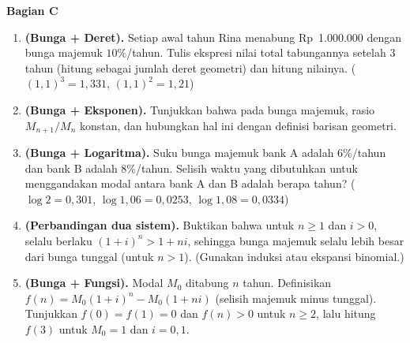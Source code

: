 \documentclass[11pt,a4paper]{report}
\theoremstyle{gaya}
\newcommand{\bagiansoal}[2]{%
  \par\medskip\noindent
  {\large\bfseries\color{biru}Bagian #1}\par\smallskip
  \addcontentsline{toc}{subsection}{Bagian #1}}
\begin{document}
\bagiansoal{C}{Advanced (setara Olimpiade SMA --- gabungan dengan Barisan/Deret \& Eksponen)}
\begin{enumerate}[leftmargin=*]
  \item \textbf{(Bunga + Deret).} Setiap awal tahun Rina menabung Rp~1.000.000 dengan bunga majemuk $10\%$/tahun. Tulis ekspresi nilai total tabungannya setelah 3 tahun (hitung sebagai jumlah deret geometri) dan hitung nilainya. ($(1{,}1)^3=1{,}331$, $(1{,}1)^2=1{,}21$)
  \item \textbf{(Bunga + Eksponen).} Tunjukkan bahwa pada bunga majemuk, rasio $M_{n+1}/M_n$ konstan, dan hubungkan hal ini dengan definisi barisan geometri.
  \item \textbf{(Bunga + Logaritma).} Suku bunga majemuk bank A adalah $6\%$/tahun dan bank B adalah $8\%$/tahun. Selisih waktu yang dibutuhkan untuk menggandakan modal antara bank A dan B adalah berapa tahun? ($\log 2=0{,}301$, $\log 1{,}06=0{,}0253$, $\log 1{,}08=0{,}0334$)
  \item \textbf{(Perbandingan dua sistem).} Buktikan bahwa untuk $n \ge 1$ dan $i > 0$, selalu berlaku $(1+i)^n > 1+ni$, sehingga bunga majemuk selalu lebih besar dari bunga tunggal (untuk $n > 1$). (Gunakan induksi atau ekspansi binomial.)
  \item \textbf{(Bunga + Fungsi).} Modal $M_0$ ditabung $n$ tahun. Definisikan $f(n) = M_0(1+i)^n - M_0(1+ni)$ (selisih majemuk minus tunggal). Tunjukkan $f(0)=f(1)=0$ dan $f(n)>0$ untuk $n\ge2$, lalu hitung $f(3)$ untuk $M_0=1$ dan $i=0{,}1$.
\end{enumerate}
\end{document}
